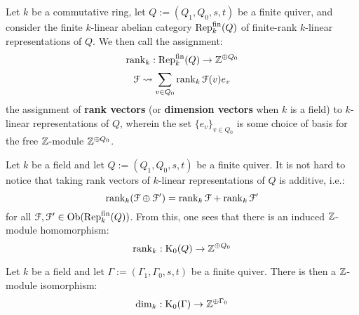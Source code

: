             \begin{definition} \label{def: dimension_vectors_of_quiver_representations}
                Let $k$ be a commutative ring, let $Q := (Q_1, Q_0, s, t)$ be a finite quiver, and consider the finite $k$-linear abelian category $\mathrm{Rep}_k^{\mathrm{fin}}(Q)$ of finite-rank $k$-linear representations of $Q$. We then call the assignment:
                    $$\operatorname{rank}_k: \mathrm{Rep}_k^{\mathrm{fin}}(Q) \to \mathbb{Z}^{\oplus Q_0}$$
                    $$\mathcal{F} \leadsto \sum_{v \in Q_0} \operatorname{rank}_k \mathcal{F}(v) e_v$$
                the assignment of \textbf{rank vectors} (or \textbf{dimension vectors} when $k$ is a field) to $k$-linear representations of $Q$, wherein the set $\{e_v\}_{v \in Q_0}$ is some choice of basis for the free $\mathbb{Z}$-module $\mathbb{Z}^{\oplus Q_0}$.
            \end{definition}
            \begin{remark} \label{remark: taking_dimension_vectors_is_Z_linear}
                Let $k$ be a field and let $Q := (Q_1, Q_0, s, t)$ be a finite quiver. It is not hard to notice that taking rank vectors of $k$-linear representations of $Q$ is additive, i.e.:
                    $$\operatorname{rank}_k (\mathcal{F} \oplus \mathcal{F}') = \operatorname{rank}_k \mathcal{F} + \operatorname{rank}_k \mathcal{F}'$$
                for all $\mathcal{F}, \mathcal{F}' \in \mathrm{Ob}(\mathrm{Rep}_k^{\mathrm{fin}}(Q))$. From this, one sees that there is an induced $\mathbb{Z}$-module homomorphism:
                    $$\operatorname{rank}_k: \mathrm{K}_0(Q) \to \mathbb{Z}^{\oplus Q_0}$$
            \end{remark}
            \begin{lemma} \label{lemma: irreducible_representations_of_finite_quivers_are_labelled_by_vertices}
                Let $k$ be a field and let $\Gamma := (\Gamma_1, \Gamma_0, s, t)$ be a finite quiver. There is then a $\mathbb{Z}$-module isomorphism:
                    $$\dim_k: \mathrm{K}_0(\Gamma) \to \mathbb{Z}^{\oplus \Gamma_0}$$
            \end{lemma}
